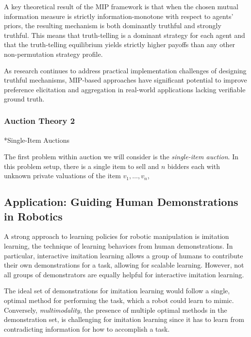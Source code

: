 \documentclass[
  letterpaper,
  numbers=noenddot,
  DIV=11]{scrreprt}
\makeatletter
\let\oldparagraph\paragraph
\renewcommand{\paragraph}{
    \@ifstar
      \xxxParagraphStar
      \xxxParagraphNoStar
  }
\newcommand{\xxxParagraphStar}[1]{\oldparagraph*{#1}\mbox{}}
\newcommand{\xxxParagraphNoStar}[1]{\oldparagraph{#1}\mbox{}}
\theoremstyle{plain}
\theoremstyle{definition}
\theoremstyle{plain}
\theoremstyle{remark}
\makeatother
\begin{document}
A key theoretical result of the MIP framework is that when the chosen
mutual information measure is strictly information-monotone with respect
to agents' priors, the resulting mechanism is both dominantly truthful
and strongly truthful. This means that truth-telling is a dominant
strategy for each agent and that the truth-telling equilibrium yields
strictly higher payoffs than any other non-permutation strategy profile.

As research continues to address practical implementation challenges of
designing truthful mechanisms, MIP-based approaches have significant
potential to improve preference elicitation and aggregation in
real-world applications lacking verifiable ground truth.

\subsubsection*{Auction Theory 2}\label{auction-theory-2}

\paragraph*{Single-Item Auctions}\label{single-item-auctions-1}

The first problem within auction we will consider is the
\emph{single-item auction}. In this problem setup, there is a single
item to sell and \(n\) bidders each with unknown private valuations of
the item \(v_1, \ldots, v_n\),

\subsection{Application: Guiding Human Demonstrations in
Robotics}\label{application-guiding-human-demonstrations-in-robotics}

A strong approach to learning policies for robotic manipulation is
imitation learning, the technique of learning behaviors from human
demonstrations. In particular, interactive imitation learning allows a
group of humans to contribute their own demonstrations for a task,
allowing for scalable learning. However, not all groups of demonstrators
are equally helpful for interactive imitation learning.

The ideal set of demonstrations for imitation learning would follow a
single, optimal method for performing the task, which a robot could
learn to mimic. Conversely, \emph{multimodality}, the presence of
multiple optimal methods in the demonstration set, is challenging for
imitation learning since it has to learn from contradicting information
for how to accomplish a task.
\end{document}
